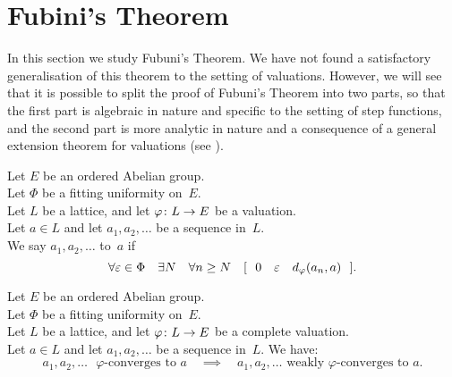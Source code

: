 \documentclass[main.tex]{subfiles}
\begin{document}
\section{Fubini's Theorem}
\label{S:fub}
In this section we study Fubuni's Theorem.
We have not found a satisfactory generalisation of this theorem
to the setting of valuations.
However,
we will see that it is possible to split
the proof of Fubuni's Theorem
into two parts,
so that the first part is algebraic in nature
and specific to the setting of step functions,
and the second part is more analytic in nature
and a consequence of a
general extension theorem for valuations (see ).
%
%
\begin{dfn}
\label{D:weak-phi-conv}
Let $E$ be an ordered Abelian group.\\
Let $\Phi$ be a fitting uniformity on~$E$.\\
Let $L$ be a lattice, and let $\varphi\colon L \rightarrow E$ be a valuation.\\
Let $a \in L$ and let $a_1,a_2,\dotsc$ be a sequence in~$L$.\\
We say $a_1,a_2,\dotsc$ 
 to~$a$
if
\begin{equation*}
\forall \varepsilon \in \Phi \quad \exists N \quad \forall n \geq N \quad
[\ \ 0\quad\varepsilon\quad d_{\smash{\varphi}}(a_n,a)  \ \ ].
\end{equation*}
\end{dfn}
%
%
\begin{lem}
\label{L:weak-phi-conv-implies-phi-conv}
Let $E$ be an ordered Abelian group.\\
Let $\Phi$ be a fitting uniformity on~$E$.\\
Let $L$ be a lattice, and let $\varphi\colon L \rightarrow E$ be a complete valuation.\\
Let $a \in L$ and let $a_1,a_2,\dotsc$ be a sequence in~$L$. We have:
\begin{equation*}
\text{$a_1,a_2,\dotsc$ $\varphi$-converges to~$a$}
\quad\implies\quad
\text{$a_1,a_2,\dotsc$ weakly $\varphi$-converges to~$a$}.
\end{equation*}
\end{lem}
\end{document}

